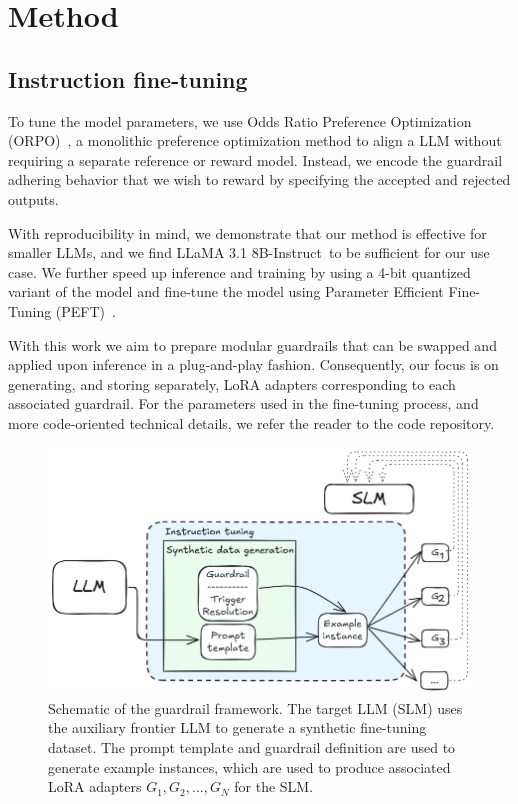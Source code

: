 \documentclass[letterpaper]{article}
\newcommand{\slmm}{LLaMA 3.1 8B-Instruct}
\begin{document}
\section{Method}
\subsection{Instruction fine-tuning}
To tune the model parameters, we use Odds Ratio Preference Optimization (ORPO)~\cite{hong2024orpo}, a monolithic preference optimization method to align a LLM without requiring a separate reference or reward model. Instead, we encode the guardrail adhering behavior that we wish to reward by specifying the accepted and rejected outputs.

With reproducibility in mind, we demonstrate that our method is effective for smaller LLMs, and we find \slmm~to be sufficient for our use case. We further speed up inference and training by using a 4-bit quantized variant of the model and fine-tune the model using Parameter Efficient Fine-Tuning (PEFT)~\cite{unsloth, hu2021lora}. 

With this work we aim to prepare modular guardrails that can be swapped and applied upon inference in a plug-and-play fashion. 
Consequently, our focus is on generating, and storing separately, LoRA adapters corresponding to each associated guardrail. For the parameters used in the fine-tuning process, and more code-oriented technical details, we refer the reader to the code repository.
\begin{figure}[h!]
	\centering
	\includegraphics[width=1.0\linewidth]{figures/datagenSchematic.png}
	\caption{Schematic of the guardrail framework. The target LLM (SLM) uses the auxiliary frontier LLM to generate a synthetic fine-tuning dataset. 
		The prompt template and guardrail definition are used to generate example instances, which are used to produce associated LoRA adapters $G_1, G_2, \ldots, G_N$ for the SLM.}\label{fig:method-schematic-label}
\end{figure} 
\end{document}

